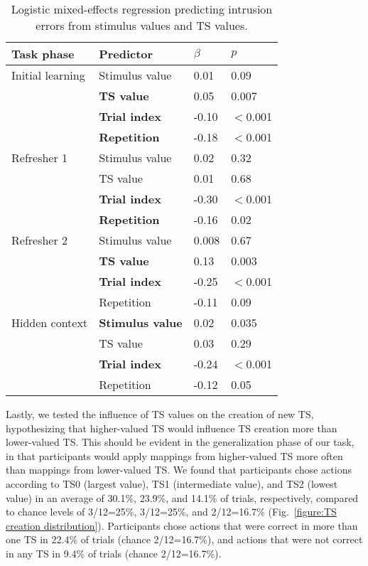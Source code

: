 \documentclass[10pt, letterpaper]{article}
\begin{document}
\begin{table}[!ht]
\begin{center} 
\caption{Logistic mixed-effects regression predicting intrusion errors from stimulus values and TS values.} 
\label{table:intrusions} 
\vskip 0.1in
\small{
\begin{tabular}{llll} 
\hline
Task phase          &   Predictor               &   $\beta$ &   $p$ \\
\hline
Initial learning    &   Stimulus value          &   0.01    &   0.09 \\
                    &   {\bf TS value}          &   0.05    &   0.007 \\
                    &   {\bf Trial index}       &   -0.10   &   $<$0.001 \\
                    &   {\bf Repetition}        &   -0.18   &   $<$0.001 \\
Refresher 1         &   Stimulus value          &   0.02    &   0.32 \\
                    &   TS value                &   0.01    &   0.68 \\
                    &   {\bf Trial index}       &   -0.30   &   $<$0.001 \\
                    &   {\bf Repetition}        &   -0.16   &   0.02 \\
Refresher 2         &   Stimulus value          &   0.008   &   0.67 \\
                    &   {\bf TS value}          &   0.13    &   0.003 \\
                    &   {\bf Trial index}       &   -0.25   &   $<$0.001 \\
                    &   Repetition              &   -0.11   &   0.09 \\
Hidden context      &   {\bf Stimulus value}    &   0.02    &   0.035 \\
                    &   TS value                &   0.03    &   0.29 \\
                    &   {\bf Trial index}       &   -0.24   &   $<$0.001 \\
                    &   Repetition              &   -0.12   &   0.05 \\
\hline
\end{tabular}
}
\end{center} 
\end{table}

Lastly, we tested the influence of TS values on the creation of new TS, hypothesizing that higher-valued TS would influence TS creation more than lower-valued TS. This should be evident in the generalization phase of our task, in that participants would apply mappings from higher-valued TS more often than mappings from lower-valued TS. We found that participants chose actions according to TS0 (largest value), TS1 (intermediate value), and TS2 (lowest value) in an average of 30.1\%, 23.9\%, and 14.1\% of trials, respectively, compared to chance levels of 3/12=25\%, 3/12=25\%, and 2/12=16.7\% (Fig.~\ref{figure:TS creation distribution}). Participants chose actions that were correct in more than one TS in 22.4\% of trials (chance 2/12=16.7\%), and actions that were not correct in any TS in 9.4\% of trials (chance 2/12=16.7\%).
\end{document}
